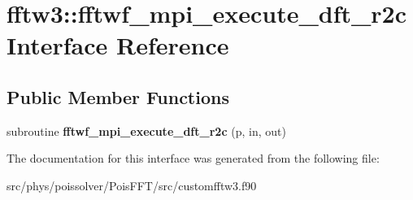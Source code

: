 \hypertarget{interfacefftw3_1_1fftwf__mpi__execute__dft__r2c}{}\section{fftw3\+:\+:fftwf\+\_\+mpi\+\_\+execute\+\_\+dft\+\_\+r2c Interface Reference}
\label{interfacefftw3_1_1fftwf__mpi__execute__dft__r2c}
\subsection*{Public Member Functions}
\begin{DoxyCompactItemize}
\item 
subroutine {\bfseries fftwf\+\_\+mpi\+\_\+execute\+\_\+dft\+\_\+r2c} (p, in, out)\hypertarget{interfacefftw3_1_1fftwf__mpi__execute__dft__r2c_a029e5ec8c6bdf95d007eb2e69f8550c7}{}\label{interfacefftw3_1_1fftwf__mpi__execute__dft__r2c_a029e5ec8c6bdf95d007eb2e69f8550c7}

\end{DoxyCompactItemize}


The documentation for this interface was generated from the following file\+:\begin{DoxyCompactItemize}
\item 
src/phys/poissolver/\+Pois\+F\+F\+T/src/customfftw3.\+f90\end{DoxyCompactItemize}
